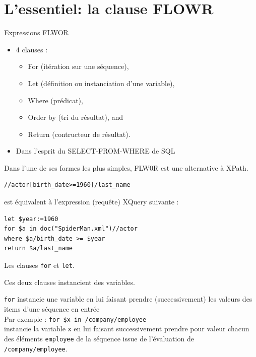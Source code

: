 \section{L'essentiel\;: la clause FLOWR}

\begin{frame}{Expressions FLWOR }

\begin{itemize}
\item  4 clauses : 
\begin{itemize}
\item  For (itération sur une séquence), 
\item  Let (définition ou instanciation d'une variable), 
\item  Where (prédicat), 
\item  Order by (tri du résultat), and 
\item  Return (contructeur de résultat).
\end{itemize}
\item  Dans l'esprit du SELECT-FROM-WHERE de SQL
\end{itemize}



\framebreak

Dans l'une de ses formes les plus simples, FLW0R est une alternative à XPath.

\begin{lstlisting}
//actor[birth_date>=1960]/last_name
\end{lstlisting}

est équivalent à l'expression (requête) XQuery suivante :

\begin{lstlisting}
let $year:=1960 
for $a in doc("SpiderMan.xml")//actor 
where $a/birth_date >= $year 
return $a/last_name
\end{lstlisting}


\framebreak

Les clauses \lstinline!for! et \lstinline!let!.

\bigskip

Ces deux clauses instancient des variables.

\bigskip

\lstinline!for! instancie une variable en lui faisant prendre (successivement) les valeurs des items d'une séquence en entrée\\
\medskip
 Par exemple : \lstinline!for $x in /company/employee! \\
instancie la variable \lstinline!x! en lui faisant successivement prendre pour valeur \alert{chacun} 
des éléments \lstinline!employee! de la séquence issue de l'évaluation de \lstinline!/company/employee!.


\end{frame}
